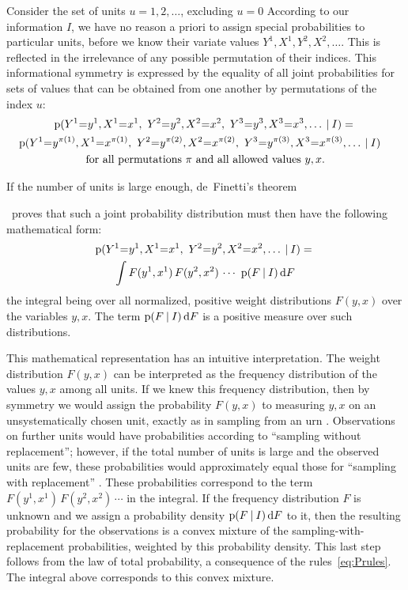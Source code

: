 \documentclass[a4paper,12pt,%
onecolumn,oneside,article,%
british%
]{memoir}
\newcommand*{\ibid}{\unspace\addtocounter{footnote}{-1}\footnotemark{}}
\newcommand*{\di}{\mathop{}\!\mathrm{d}}%
\newcommand*{\p}{\mathrm{p}}%
\renewcommand*{\|}[1][]{\nonscript\:#1\vert\nonscript\:\mathopen{}}
\newcommand*{\mo}[1][=]{\mathclose{}\mathord{\nonscript\mkern0.5mu#1\nonscript\mkern0.5mu}\mathopen{}}
\newcommand*{\chap}{ch.}%
\begin{document}
\medskip

Consider the set of units $u=1,2,\dotsc$, excluding $u=0$
According to our information $I$, we have no reason a priori to assign special probabilities to particular units, before we know their variate values $Y^{1},X^{1},Y^{2},X^{2},\dotsc$. This is reflected in the irrelevance of any possible permutation of their indices. This informational symmetry is expressed by the equality of all joint probabilities for sets of values that can be obtained from one another by permutations of the index $u$:
\begin{multline}
  \label{eq:exchang12}
  \p(Y^{1}\mo y^{1},X^{1}\mo x^{1},\ 
  Y^{2}\mo y^{2},X^{2}\mo x^{2},\ 
  Y^{3}\mo y^{3},X^{3}\mo x^{3},\dotsc
  \|I) =
  {}\\
\shoveright{  \p(Y^{1}\mo y^{\pi(1)},X^{1}\mo x^{\pi(1)},\ 
  Y^{2}\mo y^{\pi(2)},X^{2}\mo x^{\pi(2)},\ 
  Y^{3}\mo y^{\pi(3)},X^{3}\mo x^{\pi(3)},\dotsc
  \|I)
}  \\
  \text{for all permutations $\pi$ and all allowed values $y,x$.}
\end{multline}

If the number of units is large enough, de~Finetti's theorem\ibid\ proves that such a joint probability distribution must then have the following mathematical form:
\begin{multline}
  \label{eq:deFinetti_integral}
  \p(Y^{1}\mo y^{1},X^{1}\mo x^{1},\ 
  Y^{2}\mo y^{2},X^{2}\mo x^{2},\dotsc
  \|I) =
  {}\\
  \int
  F(y^{1},x^{1})\, F(y^{2},x^{2})\,\dotsm
\ \p(F  \|I) \di F
\end{multline}
the integral being over all normalized, positive weight distributions $F(y,x)$ over the variables $y,x$. The term $\p(F  \|I) \di F$ is a positive measure over such distributions.


This mathematical representation has an intuitive interpretation. The weight distribution $F(y,x)$ can be interpreted as the frequency distribution of the values $y,x$ among all units. If we knew this frequency distribution, then by symmetry we would assign the probability $F(y,x)$ to measuring $y,x$ on an unsystematically chosen unit, exactly as in sampling from an urn \autocites[\chap~3]{jaynes1994_r2003}. Observations on further units would have probabilities according to \enquote{sampling without replacement}; however, if the total number of units is large and the observed units are few, these probabilities would approximately equal those for \enquote{sampling with replacement} \autocites{heathetal1976}[for error bounds see][]{diaconisetal1980}. These probabilities correspond to the term $F(y^{1},x^{1})\, F(y^{2},x^{2})\,\dotsm$ in the integral. If the frequency distribution $F$ is unknown and we assign a probability density $\p(F \|I) \di F$ to it, then the resulting probability for the observations is a convex mixture of the sampling-with-replacement probabilities, weighted by this probability density. This last step follows from the law of total probability, a consequence of the rules~\eqref{eq:Prules}. The integral above corresponds to this convex mixture.
\end{document}
